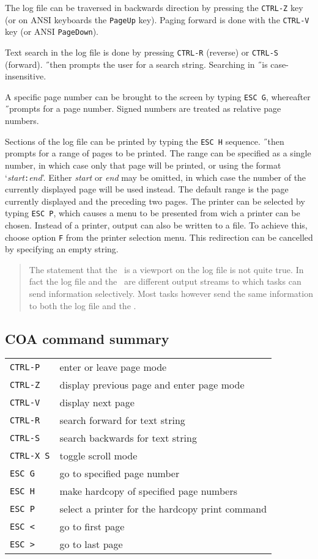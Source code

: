 The log file can be traversed in backwards direction by pressing
the {\tt CTRL-Z}\label{ctrlz} key (or on ANSI keyboards the
{\tt PageUp} key).
Paging forward is done with the {\tt CTRL-V}\label{ctrlv}\label{ctrlj} key
(or ANSI {\tt PageDown}).

Text search in the log file is done by pressing {\tt CTRL-R}\label{ctrlr}
(reverse) or
{\tt CTRL-S}\label{ctrls}
(forward). \H\ then prompts the user for a search string.
Searching in \H\ is case-insensitive.

A specific page number can be brought to the screen by typing {\tt ESC G},
\label{escg} whereafter \H\ prompts for a page number.
Signed numbers are treated as relative page numbers.

Sections of the log file can be printed by typing the {\tt ESC H}\label{esch}
sequence.
\H\ then prompts for a range of pages to be printed.
The range can be specified as a single number, in which case only that page
will be printed, or using the format `{\it start\/}{\tt :}{\it end\/}'.
Either {\it start\/} or {\it end\/} may be omitted, in which case the number
of the currently displayed page will be used instead.
The default range is the page currently displayed and the preceding two pages.
The printer can be selected by typing {\tt ESC P}, \label{escp} which causes
a menu to be presented from wich a printer can be chosen.
Instead of a printer, output can also be written to a file. To achieve this,
choose option {\tt F} from the printer selection menu. This redirection
can be cancelled by specifying an empty string.

\begin{quote}
\small
The statement that the \COA\ is a viewport on the log file is not quite true.
In fact the log file and the \COA\ are different output streams to which tasks
can send information selectively.
Most tasks however send the same information to both the log file and the \COA .
\end{quote}

\subsection*{COA command summary}

\begin{tabular}{ll}
{\tt CTRL-P}&enter or leave page mode\\
{\tt CTRL-Z}&display previous page and enter page mode\\
{\tt CTRL-V}&display next page\\
{\tt CTRL-R}&search forward for text string\\
{\tt CTRL-S}&search backwards for text string\\
{\tt CTRL-X S}&toggle scroll mode\\
{\tt ESC G}&go to specified page number\\
{\tt ESC H}&make hardcopy of specified page numbers\\
{\tt ESC P}&select a printer for the hardcopy print command\\
{\tt ESC <}&go to first page\\
{\tt ESC >}&go to last page\\
\end{tabular}

